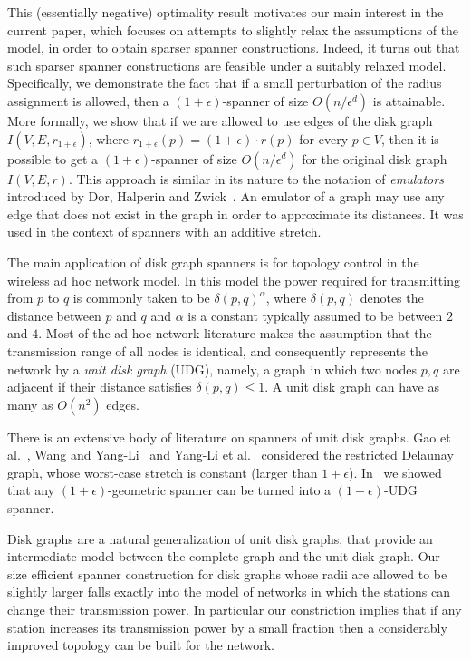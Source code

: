 \documentclass[proceedings]{stacs}
\theoremstyle{plain}\newtheorem{satz}[thm]{Satz}
\theoremstyle{definition}\newtheorem{crucial}[thm]{Crucial Definition}
\newcommand{\eps}{\epsilon}
\begin{document}
This (essentially negative) optimality result motivates our main
interest in the current paper, which focuses on attempts to
slightly relax the assumptions of the model, in order to obtain
sparser spanner constructions. Indeed, it turns out that such
sparser spanner constructions are feasible under a suitably
relaxed model. Specifically, we demonstrate the fact that if a
small perturbation of the radius assignment is allowed, then a
$(1+\eps)$-spanner of size $O(n/\eps^d)$ is attainable. More
formally, we show that if we are allowed to use edges of the disk
graph $I(V,E,r_{1+\eps})$, where $r_{1+\eps}(p) = (1+\eps)\cdot
r(p)$ for every $p\in V$, then it is possible to get a
$(1+\eps)$-spanner of size $O(n/\eps^d)$ for the original disk
graph $I(V,E,r)$. This approach is similar in its nature to the
notation of \textit{emulators} introduced by Dor, Halperin and
Zwick~\cite{DoHaZw00}. An emulator of a graph may use any edge
that does not exist in the graph in order to approximate its
distances. It was used in the context of spanners with an additive
stretch.

The main application of disk graph spanners is for topology
control in the wireless ad hoc network model. In this model the
power required for transmitting from $p$ to $q$ is commonly taken
to be $\delta(p,q)^\alpha$, where $\delta(p,q)$ denotes the
distance between $p$ and $q$ and $\alpha$ is a constant typically
assumed to be between $2$ and $4$. Most of the ad hoc network
literature makes the assumption that the transmission range of all
nodes is identical, and consequently represents the network by a
\emph{unit disk graph} (UDG), namely, a graph in which two nodes
$p,q$ are adjacent if their distance satisfies $\delta(p,q) \le
1$. A unit disk graph can have as many as $O(n^2)$ edges.

There is an extensive body of literature on spanners of unit disk
graphs. Gao et al.~\cite{gao05geometric}, Wang and
Yang-Li~\cite{WaLi06a} and Yang-Li et al.~\cite{Yang2003}
considered the restricted Delaunay graph, whose worst-case stretch
is constant (larger than $1+\epsilon$). In~\cite{PeRo08} we showed
that any $(1+\epsilon)$-geometric spanner can be turned into a
$(1+\epsilon)$-UDG spanner.

Disk graphs are a natural generalization of unit disk graphs, that
provide an intermediate model between the complete graph and the
unit disk graph. Our size efficient spanner construction for disk
graphs whose radii are allowed to be slightly larger falls exactly
into the model of networks in which the stations can change their
transmission power. In particular our constriction implies that if
any station increases its transmission power by a small fraction
then a considerably improved topology can be built for the
network.
\end{document}
